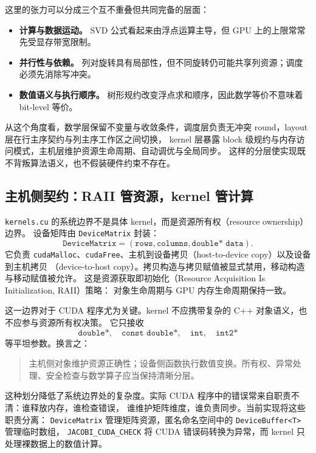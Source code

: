 这里的张力可以分成三个互不重叠但共同完备的层面：

\begin{itemize}
    \item \textbf{计算与数据运动。} SVD 公式看起来由浮点运算主导，但 GPU 上的上限常常先受显存带宽限制。
    \item \textbf{并行性与依赖。} 列对旋转具有局部性，但不同旋转仍可能共享列资源；调度必须先消除写冲突。
    \item \textbf{数值语义与执行顺序。} 树形规约改变浮点求和顺序，因此数学等价不意味着 bit-level 等价。
\end{itemize}

从这个角度看，数学层保留不变量与收敛条件，调度层负责无冲突 round，layout 层在行主序契约与列主序工作区之间切换，
kernel 层暴露 block 级规约与内存访问模式，主机层维护资源生命周期、自动调优与全局同步。
这样的分层使实现既不背叛算法语义，也不假装硬件约束不存在。

\subsection{主机侧契约：RAII 管资源，kernel 管计算}

\texttt{kernels.cu} 的系统边界不是具体 kernel，而是资源所有权（resource ownership）边界。
设备矩阵由 \texttt{DeviceMatrix} 封装：
\[
    \texttt{DeviceMatrix}
    =
    (\texttt{rows},\texttt{columns},\texttt{double* data}).
\]
它负责 \texttt{cudaMalloc}、\texttt{cudaFree}、主机到设备拷贝（host-to-device copy）以及设备到主机拷贝
（device-to-host copy）。拷贝构造与拷贝赋值被显式禁用，移动构造与移动赋值被允许。
这是资源获取即初始化（Resource Acquisition Is Initialization, RAII）策略：
对象生命周期与 GPU 内存生命周期保持一致。

这一边界对于 CUDA 程序尤为关键。kernel 不应携带复杂的 C++ 对象语义，也不应参与资源所有权决策。
它只接收
\[
    \texttt{double*},\quad \texttt{const double*},\quad \texttt{int},\quad \texttt{int2*}
\]
等平坦参数。换言之：

\begin{quote}
    主机侧对象维护资源正确性；设备侧函数执行数值变换。所有权、异常处理、安全检查与数学算子应当保持清晰分层。
\end{quote}

这种划分降低了系统边界处的复杂度。实际 CUDA 程序中的错误常来自职责不清：谁释放内存，谁检查错误，
谁维护矩阵维度，谁负责同步。当前实现将这些职责分离：
\texttt{DeviceMatrix} 管理矩阵资源，匿名命名空间中的 \texttt{DeviceBuffer<T>} 管理临时数组，
\texttt{JACOBI\_CUDA\_CHECK} 将 CUDA 错误码转换为异常，而 kernel 只处理裸数据上的数值计算。

